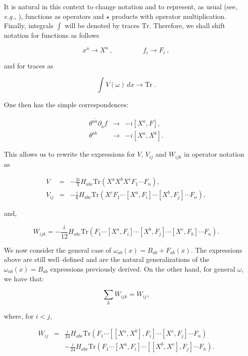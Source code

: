 \documentclass[a4paper,11pt]{article}
\begin{document}
It is natural in this context to change notation and to represent, as usual
(see, \textit{e.g.}, \cite{Cornalba-3}), functions as operators and $\star$
products with operator multiplication. Finally, integrals $\int$ will be
denoted by traces $\mathrm{Tr}$. Therefore, we shall shift notation for
functions as follows

$$
x^{a}\rightarrow X^{a}\ ,\ \ \ \ \ \ \ \ \ \ \ \ \ \ \ \ \ \ \ \
f_{i}\rightarrow F_{i}\ ,
$$

\noindent
and for traces as

$$
\int V\left( \omega \right) \,dx\rightarrow \mathrm{Tr}\ .
$$

\noindent
One then has the simple correspondences:

\begin{eqnarray*}
\theta ^{a\widetilde{a}}\partial _{\widetilde{a}}f &\rightarrow &-i [
X^{a},F ] , \\
\theta ^{ab} &\rightarrow &-i [ X^{a},X^{b} ] .
\end{eqnarray*}

\noindent
This allows us to rewrite the expressions for $V$, $V_{ij}$ and $W_{ijk}$ in
operator notation as

\begin{eqnarray*}
V &=&-\frac{2i}{3}H_{abc}\mathrm{Tr}\left( X^{a}X^{b}X^{c}F_{1}\cdots
F_{n}\right) , \\
V_{ij} &=&-\frac{i}{6}H_{abc}\mathrm{Tr}\left( X^{c}F_{1}\cdots [
X^{a},F_{i} ] \cdots [ X^{b},F_{j} ] \cdots F_{n}\right) ,
\end{eqnarray*}

\noindent
and,

$$
W_{ijk}=-\frac{i}{12}H_{abc}\mathrm{Tr}\left( F_{1}\cdots [ X^{a}, F_{i} ] 
\cdots [ X^{b},F_{j} ] \cdots [ X^{c}, F_{k} ] \cdots F_{n}\right) .
$$

We now consider the general case of $\omega_{ab}\left( x\right)
=B_{ab}+F_{ab}\left( x\right) $. The expressions above are still
well--defined and are the natural generalizations of the $\omega_{ab}
\left( x\right) =B_{ab}$ expressions previously derived. On the
other hand, for general $\omega $, we have that:

$$
\sum_{k}W_{ijk}=W_{ij},
$$

\noindent
where, for $i<j$, 

\begin{eqnarray*}
W_{ij} &=&\frac{i}{24}H_{abc}\mathrm{Tr}\left( F_{1}\cdots \left[ \left[
X^{a},X^{b}\right] ,F_{i}\right] \cdots \left[ X^{c},F_{j}\right] \cdots
F_{n}\right)  \\
&&-\frac{i}{24}H_{abc}\mathrm{Tr}\left( F_{1}\cdots \left[ X^{a},F_{i}\right]
\cdots \left[ \left[ X^{b},X^{c}\right] ,F_{j}\right] \cdots F_{n}\right) .
\end{eqnarray*}
\end{document}

